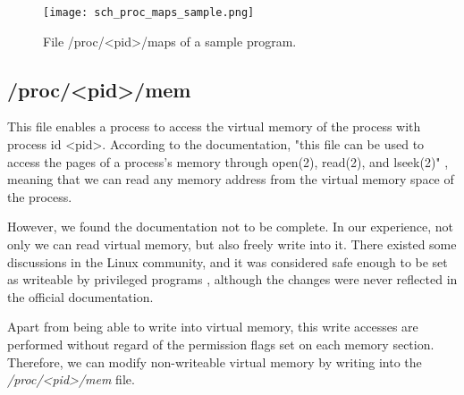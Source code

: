 \begin{figure}[htbp]
	\centering
	\texttt{[image: sch\_proc\_maps\_sample.png]}
	\caption{File /proc/<pid>/maps of a sample program.}
	\label{fig:proc_maps_sample}
\end{figure}

\subsection{/proc/<pid>/mem}
This file enables a process to access the virtual memory of the process with process id <pid>. According to the documentation, "this file can be used to access the pages of a process's memory through open(2), read(2), and lseek(2)" \cite{proc_fs}, meaning that we can read any memory address from the virtual memory space of the process.

However, we found the documentation not to be complete. In our experience, not only we can read virtual memory, but also freely write into it. There existed some discussions in the Linux community, and it was considered safe enough to be set as writeable by privileged programs \cite{proc_mem_write}, although the changes were never reflected in the official documentation.

Apart from being able to write into virtual memory, this write accesses are performed without regard of the permission flags set on each memory section. Therefore, we can modify non-writeable virtual memory by writing into the \textit{/proc/<pid>/mem} file.

